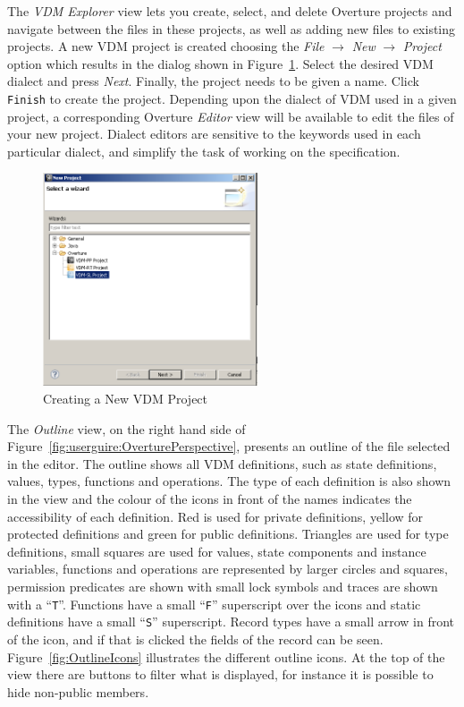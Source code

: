 \documentclass{overturerepchap}
\begin{document}
The \emph{VDM Explorer} view lets you create, select, 
and delete Overture projects and navigate between the files in these 
projects, as well as adding new files to existing projects. A new VDM
project is created choosing the \emph{File} $ \rightarrow$ \emph{New}
$\rightarrow$ \emph{Project} option which results in the dialog shown in
Figure~\ref{fig:userguide:newOvertureProjectSL}. Select
the desired VDM dialect and press \emph{Next}. Finally, the project
needs to be given a name. Click \texttt{Finish} to create the project.
Depending upon the dialect of VDM used in a given project,
a corresponding Overture \emph{Editor} view will be available to edit the files of
your new project. Dialect editors are sensitive to the keywords used in
each particular dialect, and simplify the task of working on the
specification.

\begin{figure}[!h]
\begin{center}
  \includegraphics[width=2.5in]{figures/newovertureSLproject}
  \caption[labelInTOC]{Creating a New VDM Project}
  \label{fig:userguide:newOvertureProjectSL}
\end{center}
\end{figure}


The \emph{Outline} view, on the right hand side of 
Figure~\ref{fig:userguire:OverturePerspective}, presents an outline of
the file selected
in the editor. The outline shows all VDM definitions, such as
state definitions, values, types, functions and operations. The
type of each definition is also shown in the view and the colour of
the icons in front of the names indicates the accessibility of each
definition. Red is
used for private definitions, yellow for protected definitions and
green for public definitions. Triangles are used for
type definitions, small squares are used for values, state components
and instance variables, functions and operations are represented by
larger circles and squares, permission predicates are shown with small
lock symbols and traces are shown with a
``\texttt{T}''. Functions have a small ``\texttt{F}'' superscript over the
icons and static definitions have a small ``\texttt{S}'' superscript.
Record types have a small arrow in front of the
icon, and if that is clicked the fields of the record can be seen.
Figure~\ref{fig:OutlineIcons} illustrates the different outline icons.
At the top of the view there are buttons to filter what is displayed,
for instance it is possible to hide non-public members.
\end{document}
